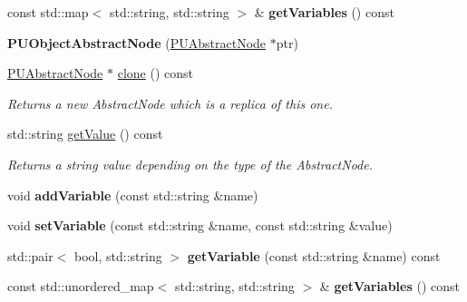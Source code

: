 \begin{DoxyCompactItemize}
const std\+::map$<$ std\+::string, std\+::string $>$ \& {\bfseries get\+Variables} () const
\item 
\mbox{\label{classPUObjectAbstractNode_a59d869ce6dc66d387f0d0b9ba4b8191c}} 
{\bfseries P\+U\+Object\+Abstract\+Node} (\hyperlink{classPUAbstractNode}{P\+U\+Abstract\+Node} $\ast$ptr)
\item 
\mbox{\label{classPUObjectAbstractNode_aee9fd2c03cfc3868555c7ba8d5a2352c}} 
\hyperlink{classPUAbstractNode}{P\+U\+Abstract\+Node} $\ast$ \hyperlink{classPUObjectAbstractNode_aee9fd2c03cfc3868555c7ba8d5a2352c}{clone} () const
\begin{DoxyCompactList}\small\item\em Returns a new Abstract\+Node which is a replica of this one. \end{DoxyCompactList}\item 
\mbox{\label{classPUObjectAbstractNode_a859fc9b0562660a77a118ae3d1983737}} 
std\+::string \hyperlink{classPUObjectAbstractNode_a859fc9b0562660a77a118ae3d1983737}{get\+Value} () const
\begin{DoxyCompactList}\small\item\em Returns a string value depending on the type of the Abstract\+Node. \end{DoxyCompactList}\item 
\mbox{\label{classPUObjectAbstractNode_ad7b08c7a0897e919aa7d1e0be78c306f}} 
void {\bfseries add\+Variable} (const std\+::string \&name)
\item 
\mbox{\label{classPUObjectAbstractNode_ae98fd5a241df53c34c231b45749d5e89}} 
void {\bfseries set\+Variable} (const std\+::string \&name, const std\+::string \&value)
\item 
\mbox{\label{classPUObjectAbstractNode_a4e160194c8b876649f6a22fa3852e1eb}} 
std\+::pair$<$ bool, std\+::string $>$ {\bfseries get\+Variable} (const std\+::string \&name) const
\item 
\mbox{\label{classPUObjectAbstractNode_abca788e08ea8da2f82d2b260313c89a4}} 
const std\+::unordered\+\_\+map$<$ std\+::string, std\+::string $>$ \& {\bfseries get\+Variables} () const
\end{DoxyCompactItemize}
